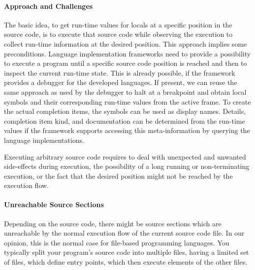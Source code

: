\documentclass[sigplan,10pt,review,anonymous]{acmart}
\begin{document}
    \paragraph{Approach and Challenges}
    The basic idea, to get run-time values for locals at a specific position in the source code, is to execute that source code while observing the execution to collect run-time information at the desired position.
    This approach implies some preconditions. Language implementation frameworks need to provide a possibility to execute a program until a specific source code position is reached and then to inspect the current run-time state. This is already possible, if the framework provides a debugger for the developed languages. If present, we can reuse the same approach as used by the debugger to halt at a breakpoint and obtain local symbols and their corresponding run-time values from the active frame. To create the actual completion items, the symbols can be used as display names. Details, completion item kind, and documentation can be determined from the run-time values if the framework supports accessing this meta-information by querying the language implementations. 
    
    Executing arbitrary source code requires to deal with unexpected and unwanted side-effects during execution, the possibility of a long running or non-terminating execution, or the fact that the desired position might not be reached by the execution flow.

    \paragraph{Unreachable Source Sections}
    Depending on the source code, there might be source sections which are unreachable by the normal execution flow of the current source code file. In our opinion, this is the normal case for file-based programming languages. You typically split your program's source code into multiple files, having a limited set of files, which define entry points, which then execute elements of the other files.
\end{document}
